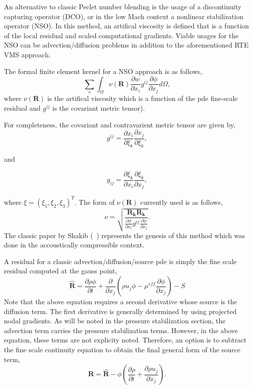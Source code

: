 An alternative to classic Peclet number blending is the usage of a discontinuity 
capturing operator (DCO), or in the low Mach context a nonlinear stabilization 
operator (NSO). In this method, an artifical viscosity is defined that is a function 
of the local residual and scaled computational gradients. Viable usages for the NSO 
can be advection/diffusion problems in addition to the aforementioned RTE VMS approach.

The formal finite element kernel for a NSO approach is as follows,
\begin{equation}
  \sum_e \int_\Omega \nu(\mathbf{R}) \frac{\partial w}{\partial x_i} g^{ij} \frac{\partial \phi} {\partial x_j} d\Omega,
\label{nsoFEMForm}
\end{equation}
where $\nu(\mathbf{R})$ is the artifical viscosity which is a function of the pde fine-scale residual and $g^{ij}$ 
is the covariant metric tensor).

For completeness, the covariant and contravarient metric tensor are given by,
\begin{equation}
  g^{ij} = \frac{\partial x_i} {\partial \xi_k}\frac{\partial x_j} {\partial \xi_k},
\label{coVariant}
\end{equation}

 and

\begin{equation}
  g_{ij} = \frac{\partial \xi_k} {\partial x_i} \frac{\partial \xi_k} {\partial x_j},
\label{coVariant}
\end{equation}

where $\xi = (\xi_1, \xi_2, \xi_3)^T$.
%
The form of $\nu(\mathbf{R})$ currently used is as follows,
\begin{equation}
  \nu = \sqrt{ \frac{\mathbf{R_k} \mathbf{R_k}} {\frac {\partial \phi}{\partial x_i} g^{ij} \frac{\partial \phi}{\partial x_j}} }.
\label{nuOne}
\end{equation}
The classic paper by Shakib (~\cite{Shakib:1991}) represents the genesis of this method which was done 
in the accoustically compressible context.

A residual for a classic advection/diffusion/source pde is simply the fine scale residual 
computed at the gauss point,
\begin{equation}
 \mathbf{\hat R} = \frac{\partial \rho \phi}{\partial t} + \frac{\partial}{\partial x_j} (\rho u_j \phi - \mu^{eff} \frac{\partial \phi}{\partial x_j}) -S
 \label{nsoResidual}
\end{equation}
Note that the above equation requires a second derivative whose source is the 
diffusion term. The first derivative is generally determined by using projected 
nodal gradients. As will be noted in the pressure stabilization section, the advection 
term carries the pressure stabilization terms. However, in the above equation, these 
terms are not explicity noted. Therefore, an option is to subtract the fine scale 
continuity equation to obtain the final general form of the source term,
\begin{equation}
 \mathbf{R} = \mathbf{\hat R} - \phi (\frac{\partial \rho}{\partial t} + \frac{\partial \rho u_j }{\partial x_j}).
 \label{nsoResidual}
\end{equation}

